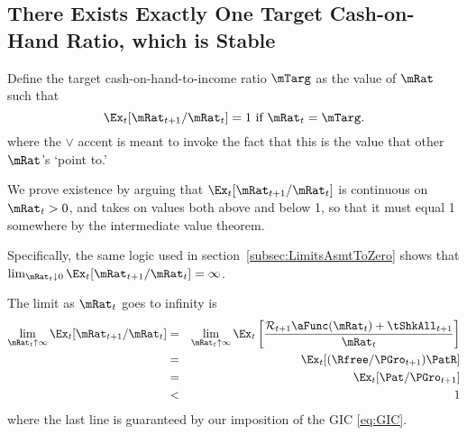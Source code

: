 \documentclass[titlepage]{\econtex}\providecommand{\texname}{BufferStockTheory}
\begin{document}
{\hypertarget{onetarget}{}
\subsection{There Exists Exactly One Target Cash-on-Hand Ratio,
which is Stable}

\label{subsec:onetarget}

Define the target cash-on-hand-to-income ratio $\mTarg$ as the value of $\mRat$
such that
\begin{equation}  \label{eq:mTarget}
\Ex_t [{\mRat}_{t+1}/\mRat_t] = 1 \mbox{~if~} \mRat_t = \mTarg.
\end{equation}
where the $\vee$ accent is meant to invoke the fact that this is the value that other $\mRat$'s `point to.'

We prove existence by arguing that $\Ex_t [{\mRat}_{t+1}/\mRat_t]$ is
continuous on $\mRat_{t}>0$, %
and takes on values both above and below 1,
so that it must equal 1 somewhere by the intermediate
value theorem.

Specifically, the same logic used in section~\ref{subsec:LimitsAsmtToZero} shows
that $\lim_{\mRat_t \downarrow 0} \Ex_t [{\mRat}_{t+1}/\mRat_t] =
\infty$.

The limit as $\mRat_{t}$ goes to infinity is
\begin{eqnarray*}
  \lim_{\mRat_{t} \uparrow \infty} \Ex_{t}[{\mRat}_{t+1}/\mRat_{t}] & = &   \lim_{\mRat_{t} \uparrow \infty} \Ex_{t}\left[\frac{{\mathcal{\mathcal{R}}}_{t+1}\aFunc(\mRat_{t})+{\tShkAll}_{t+1}}{\mRat_{t}}\right]
\\ & = & \Ex_{t}[(\Rfree/{\PGro}_{t+1})\PatR]
\\ & = & \Ex_{t}[{\Pat}/{\PGro}_{t+1}]
\\ & < & 1
\end{eqnarray*}
where the last line is guaranteed by our imposition of the GIC \eqref{eq:GIC}.

}
\end{document}
